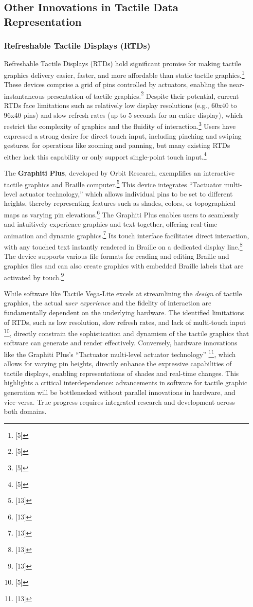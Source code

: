 \subsection{Other Innovations in Tactile Data Representation}

\subsubsection{Refreshable Tactile Displays (RTDs)}
Refreshable Tactile Displays (RTDs) hold significant promise for making tactile graphics delivery easier, faster, and more affordable than static tactile graphics.\footnote{[5]} These devices comprise a grid of pins controlled by actuators, enabling the near-instantaneous presentation of tactile graphics.\footnote{[5]} Despite their potential, current RTDs face limitations such as relatively low display resolutions (e.g., 60x40 to 96x40 pins) and slow refresh rates (up to 5 seconds for an entire display), which restrict the complexity of graphics and the fluidity of interaction.\footnote{[5]} Users have expressed a strong desire for direct touch input, including pinching and swiping gestures, for operations like zooming and panning, but many existing RTDs either lack this capability or only support single-point touch input.\footnote{[5]}

The \textbf{Graphiti Plus}, developed by Orbit Research, exemplifies an interactive tactile graphics and Braille computer.\footnote{[13]} This device integrates ``Tactuator\texttrademark{} multi-level actuator technology,'' which allows individual pins to be set to different heights, thereby representing features such as shades, colors, or topographical maps as varying pin elevations.\footnote{[13]} The Graphiti Plus enables users to seamlessly and intuitively experience graphics and text together, offering real-time animation and dynamic graphics.\footnote{[13]} Its touch interface facilitates direct interaction, with any touched text instantly rendered in Braille on a dedicated display line.\footnote{[13]} The device supports various file formats for reading and editing Braille and graphics files and can also create graphics with embedded Braille labels that are activated by touch.\footnote{[13]}

While software like Tactile Vega-Lite excels at streamlining the \textit{design} of tactile graphics, the actual \textit{user experience} and the fidelity of interaction are fundamentally dependent on the underlying hardware. The identified limitations of RTDs, such as low resolution, slow refresh rates, and lack of multi-touch input \footnote{[5]}, directly constrain the sophistication and dynamism of the tactile graphics that software can generate and render effectively. Conversely, hardware innovations like the Graphiti Plus's ``Tactuator\texttrademark{} multi-level actuator technology'' \footnote{[13]}, which allows for varying pin heights, directly enhance the expressive capabilities of tactile displays, enabling representations of shades and real-time changes. This highlights a critical interdependence: advancements in software for tactile graphic generation will be bottlenecked without parallel innovations in hardware, and vice-versa. True progress requires integrated research and development across both domains.

